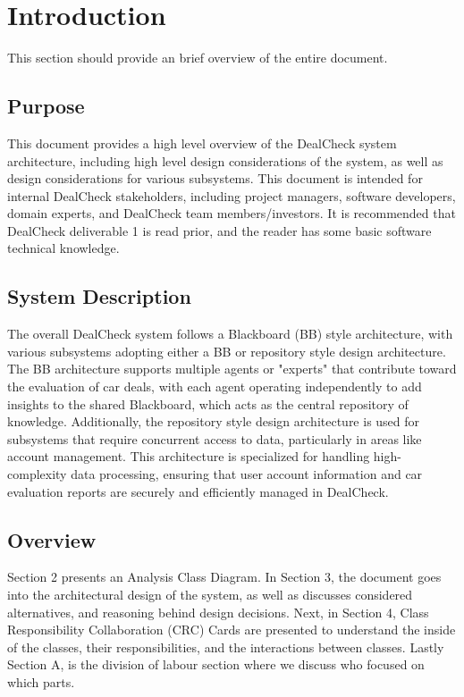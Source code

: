 \documentclass[]{article}
\begin{document}
\newpage
\section{Introduction}
\label{sec:introduction}

This section should provide an brief overview of the entire document.

\subsection{Purpose}
\label{sub:purpose}
This document provides a high level overview of the DealCheck system architecture, including high level design considerations of the system, as well as design considerations for various subsystems. This document is intended for internal DealCheck stakeholders, including project managers, software developers, domain experts, and DealCheck team members/investors. It is recommended that DealCheck deliverable 1 is read prior, and the reader has some basic software technical knowledge.

\subsection{System Description}
\label{sub:system_description}
The overall DealCheck system follows a Blackboard (BB) style architecture, with various subsystems adopting either a BB or repository style design architecture.
The BB architecture supports multiple agents or "experts" that contribute toward the evaluation of car deals, with each agent operating independently to add insights to the shared Blackboard, which acts as the central repository of knowledge.
Additionally, the repository style design architecture is used for subsystems that require concurrent access to data, particularly in areas like account management. This architecture is specialized for handling high-complexity data processing, ensuring that user account information and car evaluation reports are securely and efficiently managed in DealCheck.

\subsection{Overview}
\label{sub:overview}
Section 2 presents an Analysis Class Diagram. In Section 3, the document goes into the architectural design of the system, as well as discusses considered alternatives, and reasoning behind design decisions. Next, in Section 4, Class Responsibility Collaboration (CRC) Cards are presented to understand the inside of the classes, their responsibilities, and the interactions between classes. Lastly Section A, is the division of labour section where we discuss who focused on which parts.
\end{document}
